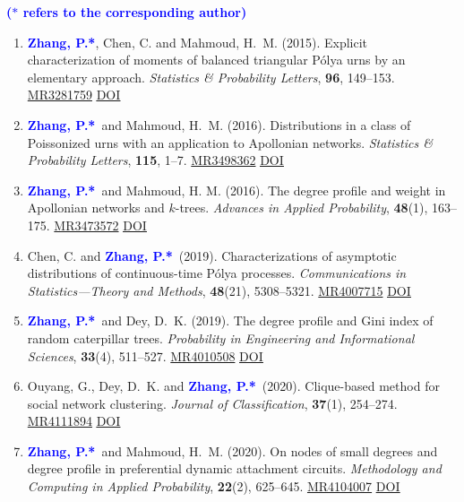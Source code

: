 \documentclass[12pt]{article}
\def\MR#1{\href{http://www.ams.org/mathscinet-getitem?mr=#1}{MR#1}}
\newcommand{\PZ}{\textbf{\textcolor{blue}{Zhang, P.*}}}
\begin{document}
	{\bf \textcolor{blue}{($\ast$ refers to the corresponding author)}}
	
	\noindent {\bf \textcolor{brown}{($\dagger$ refers to my students, postdocs 
			or trainees)}}
	
	\begin{enumerate}
		\item \PZ, {\sc Chen, C.} and {\sc Mahmoud, H.\ M.} 
		(2015). Explicit characterization of moments of balanced 
		triangular P\'{o}lya urns by an elementary approach. 
		\emph{Statistics \& Probability Letters}, {\bf 96}, 149--153. \MR{3281759} \href{https://doi.org/10.1016/j.spl.2014.09.016}
		{\underline{DOI}}
		
		\item \PZ\ and {\sc Mahmoud, H.\ M.} (2016). 
		Distributions in a class of Poissonized urns with an application to Apollonian networks. \emph{Statistics \& Probability Letters}, {\bf 115}, 1--7. \MR{3498362}
		\href{https://doi.org/10.1016/j.spl.2016.03.023}
		{\underline{DOI}}
		
		\item \PZ\ and {\sc Mahmoud, H. M.} (2016). The 
		degree profile and weight in Apollonian networks and $k$-trees. {\em Advances in Applied Probability}, \textbf{48}(1), 163--175. \MR{3473572}
		\href{https://doi.org/10.1017/apr.2015.11}
		{\underline{DOI}}
		
		\item {\sc Chen, C.} and \PZ\ (2019). Characterizations of 
		asymptotic distributions of continuous-time P\'{o}lya processes. {\em Communications in Statistics---Theory and Methods}, \textbf{48}(21), 5308--5321. \MR{4007715}
		\href{https://doi.org/10.1080/03610926.2018.1510005}
		{\underline{DOI}}
		
		\item \PZ\ and {\sc Dey, D.\ K.} (2019). The degree 
		profile and Gini index of random caterpillar trees. {\em 
		Probability in Engineering and Informational Sciences}, 
		\textbf{33}(4), 511--527. \MR{4010508}
		\href{https://doi.org/10.1017/S0269964818000475}
		{\underline{DOI}}
		
		\item {\sc Ouyang, G., Dey, D.\ K.} and \PZ\ (2020). 
		Clique-based method for social network clustering. {\em Journal of Classification}, \textbf{37}(1), 254--274. \MR{4111894} \href{https://doi.org/10.1007/s00357-019-9310-5}
		{\underline{DOI}}
		
		\item \PZ\ and {\sc Mahmoud, H.\ M.} (2020). On 
		nodes of small degrees and degree profile in preferential 
		dynamic attachment circuits. {\em Methodology and Computing in Applied Probability}, \textbf{22}(2), 625--645. \MR{4104007}
		\href{https://doi.org/10.1007/s11009-019-09726-4}
		{\underline{DOI}}
		

\end{enumerate}
\end{document}
